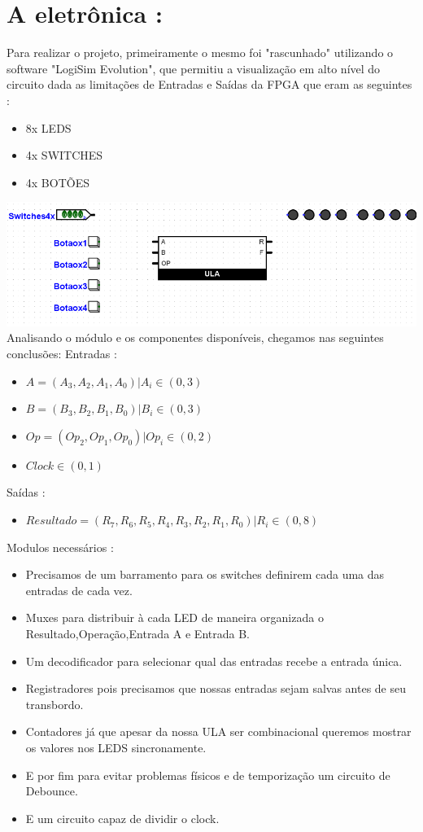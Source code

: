 \documentclass[11pt]{book}
\begin{document}
\section{A eletrônica :}
Para realizar o projeto, primeiramente o mesmo foi "rascunhado" utilizando o software "LogiSim Evolution", que permitiu a visualização em alto nível do circuito dada as limitações de Entradas e Saídas da FPGA que eram as seguintes : 
\begin{itemize}
\item 8x LEDS
\item 4x SWITCHES
\item 4x BOTÕES
\end{itemize}
\includegraphics[width=1.2\textwidth]{Design_TopLevel.png}%
Analisando o módulo e os componentes disponíveis, chegamos nas seguintes conclusões: 
\newline
Entradas : 
\begin{itemize}
    \item $A = (A_{3},A_{2},A_{1},A_{0})|A_{i}\in{(0,3)}$
    \item $B = (B_{3},B_{2},B_{1},B_{0})|B_{i}\in{(0,3)}$
    \item $Op = (Op_{2},Op_{1},Op_{0})|Op_{i}\in{(0,2)}$
    \item $Clock\in{(0,1)}$
\end{itemize}
Saídas : 
\begin{itemize}
    \item $Resultado = (R_{7},R_{6},R_{5},R_{4},R_{3},R_{2},R_{1},R_{0})|R_{i}\in{(0,8)}$
\end{itemize}

Modulos necessários : 
\begin{itemize}
    \item Precisamos de um barramento para os switches definirem cada uma das entradas de cada vez. 
    \item Muxes para distribuir à cada LED de maneira organizada o Resultado,Operação,Entrada A e Entrada B.
    \item Um decodificador para selecionar qual das entradas recebe a entrada única.
    \item Registradores pois precisamos que nossas entradas sejam salvas antes de seu transbordo.
    \item Contadores já que apesar da nossa ULA ser combinacional queremos mostrar os valores nos LEDS sincronamente. 
    \item E por fim para evitar problemas físicos e de temporização um circuito de Debounce.
    \item E um circuito capaz de dividir o clock.
\end{itemize}
\end{document}
